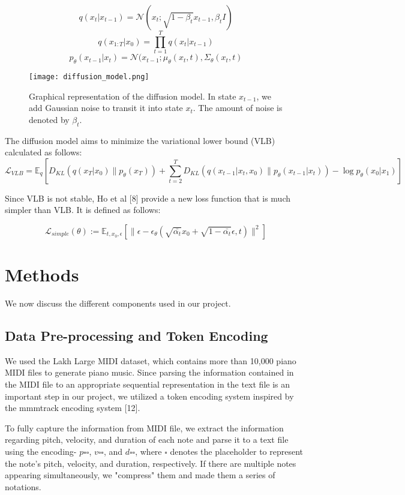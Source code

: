 \documentclass{article}
\begin{document}
$$q(x_t|x_{t-1}) = \mathcal{N}(x_t; \sqrt{1 - \beta_t}x_{t-1}, \beta_t I)$$
$$q(x_{1:T}|x_0) = \prod\limits_{t=1}^{T}q(x_t|x_{t-1})$$
$$p_{\theta}(x_{t-1}|x_t) = \mathcal{N}(x_{t-1};\mu_{\theta}(x_t, t), \Sigma_{\theta}(x_t, t)$$

\begin{figure}[!htb]
   \begin{minipage}{1\textwidth}
     \centering
     \texttt{[image: diffusion\_model.png]}
     \caption{Graphical representation of the diffusion model. In state $x_{t-1}$, we add Gaussian noise to transit it into state $x_t$. The amount of noise is denoted by $\beta_t$.}\label{Fig:Data1}
   \end{minipage}\hfill
\end{figure}


The diffusion model aims to minimize the variational lower bound (VLB) calculated as follows:
$$\mathcal{L}_{VLB} = 
\mathbb{E}_q[
D_{KL}(q(x_T|x_0) \| p_{\theta}(x_T)) 
+ 
\sum\limits_{t = 2}^{T}
D_{KL}(
q(x_{t-1}|x_t, x_0)
\|
p_{\theta}(x_{t-1}|x_t)) 
- 
\log p_{\theta}(x_0|x_1)
]$$

Since VLB is not stable, Ho et al [8] provide a new loss function that is much simpler than VLB. It is defined as follows: 

$$\mathcal{L}_{simple}(\theta) := \mathbb{E}_{t, x_0, \epsilon}[\|
\epsilon - \epsilon_{\theta}(\sqrt{\bar{\alpha_t}}x_0 +
\sqrt{1 - \bar{\alpha_t}}\epsilon, t)
\|^2]$$


\section{Methods}

We now discuss the different components used in our project. 

\subsection{Data Pre-processing and Token Encoding}

We used the Lakh Large MIDI dataset, which contains more than 10,000 piano MIDI files to generate piano music. Since parsing the information contained in the MIDI file to an appropriate sequential representation in the text file is an important step in our project, we utilized a token encoding system inspired by the mmmtrack encoding system [12]. 


To fully capture the information from MIDI file, we extract the information regarding pitch, velocity, and duration of each note and parse it to a text file using the encoding- $p\square\square$, $v\square\square$, and $d\square\square$, where $\square$ denotes the placeholder to represent the note's pitch, velocity, and duration, respectively. If there are multiple notes appearing simultaneously, we "compress" them and made them a series of notations. 
\end{document}
